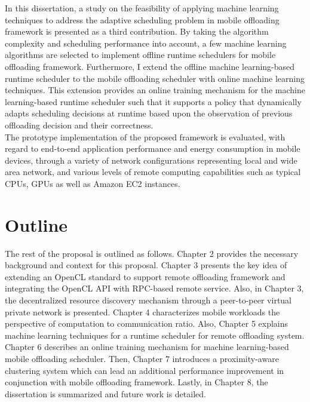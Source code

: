 %
In this dissertation, a study on the feasibility of applying machine
learning techniques to address the adaptive scheduling problem in mobile
offloading framework is presented as a third contribution.
%
By taking the algorithm complexity and scheduling performance into
account, a few machine learning algorithms are selected to implement
offline runtime schedulers for mobile offloading framework.
%
Furthermore, I extend the offline machine learning-based runtime
scheduler to the mobile offloading scheduler with online machine
learning techniques.
%
This extension provides an online training mechanism for the machine
learning-based runtime scheduler such that it supports a policy that
dynamically adapts scheduling decisions at runtime based upon the
observation of previous offloading decision and their correctness.\\
%
The prototype implementation of the proposed framework is evaluated,
with regard to end-to-end application performance and energy consumption
in mobile devices, through a variety of network configurations
representing local and wide area network, and various levels of remote
computing capabilities such as typical CPUs, GPUs as well as Amazon EC2
instances.
%
\section{Outline}
\label{intro:outline}
The rest of the proposal is outlined as follows.
%
Chapter 2 provides the necessary background and context for this
proposal.
%
Chapter 3 presents the key idea of extending an OpenCL standard to
support remote offloading framework and integrating the OpenCL API with
RPC-based remote service.
%
Also, in Chapter 3, the decentralized resource discovery mechanism
through a peer-to-peer virtual private network is presented.
%
Chapter 4 characterizes mobile workloads the perspective of computation
to communication ratio.
%
Also, Chapter 5 explains machine learning techniques for a runtime
scheduler for remote offloading system.
%
Chapter 6 describes an online training mechanism for machine
learning-based mobile offloading scheduler.
%
Then, Chapter 7 introduces a proximity-aware clustering system which can
lead an additional performance improvement in conjunction with mobile
offloading framework.
%
Lastly, in Chapter 8, the dissertation is summarized and future work
is detailed.
%
